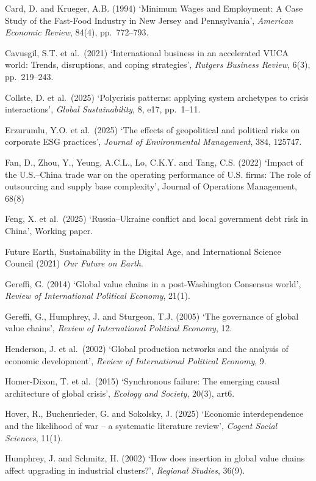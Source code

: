 \documentclass[12pt,a4paper]{article}
\begin{document}
Card, D. and Krueger, A.B. (1994) `Minimum Wages and Employment: A Case Study of the Fast-Food Industry in New Jersey and Pennsylvania', \textit{American Economic Review}, 84(4), pp.\ 772--793.

Cavusgil, S.T. et al.\ (2021) `International business in an accelerated VUCA world: Trends, disruptions, and coping strategies', \textit{Rutgers Business Review}, 6(3), pp.\ 219--243.

Collste, D. et al.\ (2025) `Polycrisis patterns: applying system archetypes to crisis interactions', \textit{Global Sustainability}, 8, e17, pp.\ 1--11.

Erzurumlu, Y.O. et al.\ (2025) `The effects of geopolitical and political risks on corporate ESG practices', \textit{Journal of Environmental Management}, 384, 125747.

Fan, D., Zhou, Y., Yeung, A.C.L., Lo, C.K.Y. and Tang, C.S. (2022) ‘Impact of the U.S.–China trade war on the operating performance of U.S. firms: The role of outsourcing and supply base complexity’, Journal of Operations Management, 68(8)

Feng, X. et al.\ (2025) `Russia--Ukraine conflict and local government debt risk in China', Working paper.

Future Earth, Sustainability in the Digital Age, and International Science Council (2021) \textit{Our Future on Earth}.

Gereffi, G. (2014) `Global value chains in a post-Washington Consensus world', \textit{Review of International Political Economy}, 21(1).

Gereffi, G., Humphrey, J. and Sturgeon, T.J. (2005) `The governance of global value chains', \textit{Review of International Political Economy}, 12.

Henderson, J. et al.\ (2002) `Global production networks and the analysis of economic development', \textit{Review of International Political Economy}, 9.

Homer-Dixon, T. et al.\ (2015) `Synchronous failure: The emerging causal architecture of global crisis', \textit{Ecology and Society}, 20(3), art6.

Hover, R., Buchenrieder, G. and Sokolsky, J. (2025) `Economic interdependence and the likelihood of war -- a systematic literature review', \textit{Cogent Social Sciences}, 11(1).

Humphrey, J. and Schmitz, H. (2002) `How does insertion in global value chains affect upgrading in industrial clusters?', \textit{Regional Studies}, 36(9).
\end{document}
